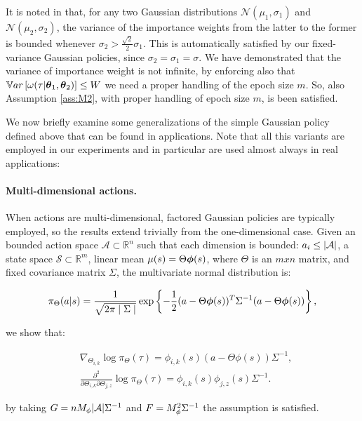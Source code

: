 It is noted in \cite{cortes2010learning} that, for any two Gaussian distributions $\mathcal{N}(\mu_1,\sigma_1)$ and $\mathcal{N}(\mu_2,\sigma_2)$, the variance of the importance weights from the latter to the former is bounded whenever $\sigma_2 > \frac{\sqrt{2}}{2}\sigma_1$. This is automatically satisfied by our fixed-variance Gaussian policies, since $\sigma_2=\sigma_1=\sigma$.
We have demonstrated that the variance of importance weight is not infinite, by enforcing also that
$\mathbb{V}ar\left[\omega(\tau| \boldsymbol{\theta}_1, \boldsymbol{\theta}_2)\right] \leq W$ we need a proper handling of the epoch size $m$.
So, also Assumption \ref{ass:M2}, with proper handling of epoch size $m$, is been satisfied.


We now briefly examine some generalizations of the simple Gaussian policy defined above that can be found in applications. Note that all this variants are employed in our experiments and in particular are used almost always in real applications:

\paragraph{Multi-dimensional actions.}
When actions are \newline multi-dimensional, factored Gaussian policies are typically employed, so the results extend trivially from the one-dimensional case. 
Given an bounded action space $\mathcal{A}\subset\mathbb{R}^n$ such that each dimension is bounded: $a_i\leq|\mathcal{A}|$, a state space $\mathcal{S}\subset\mathbb{R}^m$, linear mean $\mu(s) = \Theta\boldsymbol{\phi}(s)$, where $\Theta$  is an $mxn$ matrix, and fixed covariance matrix $\Sigma$, the multivariate normal distribution is:

\[
\pi_{\Theta}(a\vert s) = \frac{1}{\sqrt{2\pi\mid\Sigma\mid}}\exp\left\{
-\frac{1}{2}(a - \Theta\boldsymbol{\phi}(s))^T\Sigma^{-1}(a - \Theta\boldsymbol{\phi}(s))\right\},
\]

we show that:

\begin{align*}
&\nabla_{\Theta_{i,k}}\log\pi_{\Theta}(\tau) =  \phi_{i,k}(s)(a-\Theta\phi(s))\Sigma^{-1},\\
&\frac{\partial^2}{\partial\Theta_{i,k}\partial\Theta_{j,z}}\log\pi_{\Theta}(\tau) = \phi_{i,k}(s)\phi_{j,z}(s)\Sigma^{-1}.
\end{align*}

by taking $G = nM_{\phi}|\mathcal{A}|\Sigma^{-1}$ and $F = M_{\phi}^2\Sigma^{-1}$ the assumption is satisfied.

